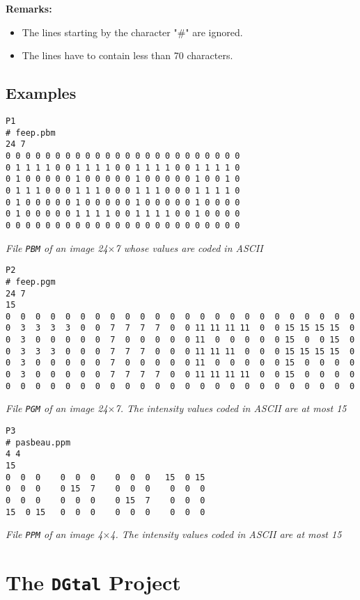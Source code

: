 \documentclass[a4paper, 11pt]{article}
\begin{document}
\noindent \textbf{Remarks:}
\begin{itemize}
	\item The lines starting by the character "\#" are ignored.
	\item The lines have to contain less than 70 characters.
\end{itemize}


\subsection*{Examples}

\begin{verbatim}
P1
# feep.pbm
24 7
0 0 0 0 0 0 0 0 0 0 0 0 0 0 0 0 0 0 0 0 0 0 0 0
0 1 1 1 1 0 0 1 1 1 1 0 0 1 1 1 1 0 0 1 1 1 1 0
0 1 0 0 0 0 0 1 0 0 0 0 0 1 0 0 0 0 0 1 0 0 1 0
0 1 1 1 0 0 0 1 1 1 0 0 0 1 1 1 0 0 0 1 1 1 1 0
0 1 0 0 0 0 0 1 0 0 0 0 0 1 0 0 0 0 0 1 0 0 0 0
0 1 0 0 0 0 0 1 1 1 1 0 0 1 1 1 1 0 0 1 0 0 0 0
0 0 0 0 0 0 0 0 0 0 0 0 0 0 0 0 0 0 0 0 0 0 0 0
\end{verbatim}
{\it File \texttt{PBM} of an image  24$\times$7 whose values are coded in ASCII}
\begin{verbatim}
P2
# feep.pgm
24 7
15
0  0  0  0  0  0  0  0  0  0  0  0  0  0  0  0  0  0  0  0  0  0  0  0
0  3  3  3  3  0  0  7  7  7  7  0  0 11 11 11 11  0  0 15 15 15 15  0
0  3  0  0  0  0  0  7  0  0  0  0  0 11  0  0  0  0  0 15  0  0 15  0
0  3  3  3  0  0  0  7  7  7  0  0  0 11 11 11  0  0  0 15 15 15 15  0
0  3  0  0  0  0  0  7  0  0  0  0  0 11  0  0  0  0  0 15  0  0  0  0
0  3  0  0  0  0  0  7  7  7  7  0  0 11 11 11 11  0  0 15  0  0  0  0
0  0  0  0  0  0  0  0  0  0  0  0  0  0  0  0  0  0  0  0  0  0  0  0
\end{verbatim}
{\it File \texttt{PGM} of an image  24$\times$7. The intensity values coded in ASCII are at most 15}
\begin{verbatim} 
P3
# pasbeau.ppm
4 4
15
0  0  0    0  0  0    0  0  0   15  0 15
0  0  0    0 15  7    0  0  0    0  0  0
0  0  0    0  0  0    0 15  7    0  0  0
15  0 15   0  0  0    0  0  0    0  0  0
\end{verbatim}
{\it File \texttt{PPM} of an image 4$\times$4. The intensity values coded in ASCII are at most 15}


\section*{The \texttt{DGtal} Project}
\end{document}
